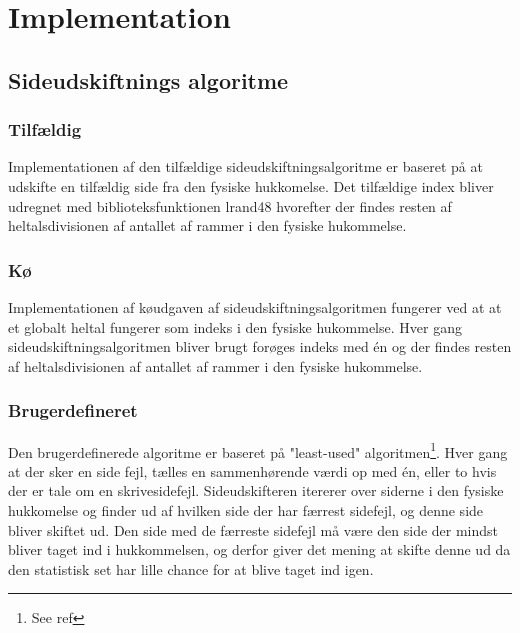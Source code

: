 \section{Implementation}
\subsection{Sideudskiftnings algoritme}
\subsubsection{Tilfældig}
Implementationen af den tilfældige sideudskiftningsalgoritme er baseret på at udskifte en tilfældig side fra den fysiske hukkomelse. Det tilfældige index bliver udregnet med biblioteksfunktionen lrand48 hvorefter der findes resten af heltalsdivisionen af antallet af rammer i den fysiske hukommelse.

\subsubsection{Kø}
Implementationen af køudgaven af sideudskiftningsalgoritmen fungerer ved at at et globalt heltal fungerer som indeks i den fysiske hukommelse. Hver gang sideudskiftningsalgoritmen bliver brugt forøges indeks med én og der findes resten af heltalsdivisionen af antallet af rammer i den fysiske hukommelse.

\subsubsection{Brugerdefineret}
Den brugerdefinerede algoritme er baseret på "least-used" algoritmen\footnote{See ref}. Hver gang at der sker en side fejl, tælles en sammenhørende værdi op med én, eller to hvis der er tale om en skrivesidefejl. Sideudskifteren itererer over siderne i den fysiske hukkomelse og finder ud af hvilken side der har færrest sidefejl, og denne side bliver skiftet ud. Den side med de færreste sidefejl må være den side der mindst bliver taget ind i hukkommelsen, og derfor giver det mening at skifte denne ud da den statistisk set har lille chance for at blive taget ind igen.